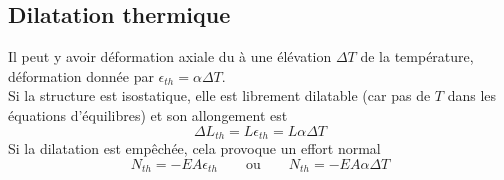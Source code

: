 	\subsection{Dilatation thermique}
	Il peut y avoir déformation axiale du à une élévation $\Delta T$ de la 
	température, déformation donnée par $\epsilon_{th} = \alpha\Delta T$. \\
	Si la structure est isostatique, elle est librement dilatable (car pas de 
	$T$ dans les équations d'équilibres) et son allongement est 
	\begin{equation}
	\Delta L_{th} = L\epsilon_{th} = L\alpha\Delta T
	\end{equation}
	Si la dilatation est empêchée, cela provoque un effort normal
	\begin{equation}
	N_{th} = -EA\epsilon_{th}\qquad\text{ou}\qquad N_{th} = -EA\alpha \Delta T
	\end{equation}
